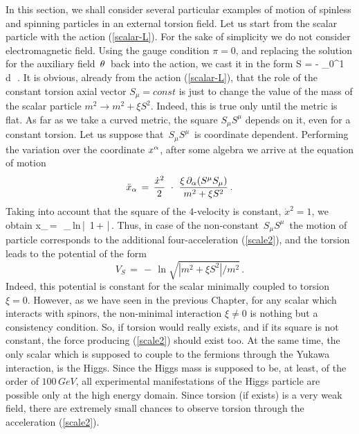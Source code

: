 In this section, we shall consider several particular examples of
motion of spinless and spinning particles in an external torsion field.
Let us start from the scalar particle with the action (\ref{scalar-L}).
For the sake of simplicity we do not consider electromagnetic field.
Using the gauge condition $\pi=0$, and replacing the solution for the
auxiliary field $\,\theta\,$ back into the action, we cast it in the form
\beq
S = - \int_0^1\,
d \tau\,\,.
\label{scalar-L1}
\eeq
It is obvious, already from the action (\ref{scalar-L}),
that the role of the constant torsion axial vector $S_\mu=const$
is just to change
the value of the mass of the scalar particle $m^2\to m^2+\xi S^2$.
Indeed, this is true only until the metric is flat. As far as we
take a curved metric, the square $S_\mu S^\mu$ depends on it, even
for a constant torsion. Let us suppose that $\,S_\mu S^\mu\,$
is coordinate dependent. 
Performing the variation over
the coordinate $x^\alpha$, after some algebra we arrive at the equation
of motion
$$ %
{\ddot x}_\al \,=\, \frac{{\dot x}^2}{2}\,\,\cdot\,\,
\frac{\xi\, \pa_\al (S^\mu S_\mu)}{m^2+\xi S^2}\,.
$$ %
Taking into account that the square of the $4$-velocity is
constant, ${\dot x}^2=1$, we obtain
\beq
{\ddot x}_\al \,=\, \,\pa_\al\,{\rm ln}\,\left|\,
1\,+\,\,\right|\,.
\label{scale2}
\eeq
Thus, in case of the non-constant $\,S_\mu S^\mu\,$ the motion 
of particle corresponds to the additional four-acceleration 
(\ref{scale2}), and the torsion leads to the potential of the 
form 
$$
V_{S}\, =\, - \, \ln \sqrt{|m^2+\xi S^2|/m^2}\,.
$$ 
Indeed, this potential
is constant for the scalar minimally coupled to torsion $\xi=0$.
However, as we have seen in the previous Chapter, for any scalar
which interacts with spinors, the non-minimal interaction $\xi\neq 0$
is nothing but a consistency condition. So, if torsion would
really exists, and if its square is not constant, the force producing
(\ref{scale2}) should exist too. At the same time, 
the only scalar which is supposed to couple to the fermions
through the Yukawa  interaction, is the Higgs. Since
the Higgs mass is supposed to be, at least, of the order of $100\,GeV$,
all experimental manifestations of the Higgs particle are possible
only at the high energy domain. Since torsion (if exists) is a very weak
field, there are extremely small chances to observe torsion through the 
acceleration (\ref{scale2}).
\vskip 3mm

